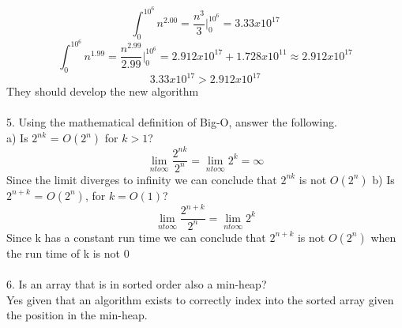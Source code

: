 \documentclass[12pt]{article}
\newcommand{\tab}{\hspace*{2em}}
\begin{document}
\begin{dmath*}\int_{0}^{10^6} n^{2.00} = \frac{n^3}{3} \Big|_0^{10^6} = 3.33x10^{17} \end{dmath*}
\begin{dmath*}\int_{0}^{10^6} n^{1.99} = \frac{n^{2.99}}{2.99} \Big|_0^{10^6} =2.912x10^{17} + 1.728x10^{11} \approx 2.912x10^{17}\end{dmath*}
\begin{dmath} 3.33x10^{17} > 2.912x10^{17}\end{dmath}
\tab\tab They should develop the new algorithm\\\\
5. Using the mathematical definition of Big-O, answer the following.\\
\tab a) Is $2^{nk}$ = $O(2^n)$ for $k>1$?
\begin{dmath} \lim_{n to \infty}\frac{2^{nk}}{2^n}=\lim_{n to \infty}2^k = \infty \end{dmath}
\tab\tab Since the limit diverges to infinity we can conclude that $2^{nk}$ is not $O(2^n)$\newpage
\tab b) Is $2^{n+k}$ = $O(2^n)$, for $k=O(1)$?\\
\begin{dmath}\lim_{n to \infty}\frac{2^{n+k}}{2^n} = \lim_{n to \infty}2^k	\end{dmath}
\tab\tab Since k has a constant run time we can conclude that $2^{n+k}$ is not $O(2^n)$ when the \tab \tab run time of k is not 0\\\\
6. Is an array that is in sorted order also a min-heap?\\
\tab Yes given that an algorithm exists to correctly index into the sorted array given the \tab position in the min-heap.
\end{document}
